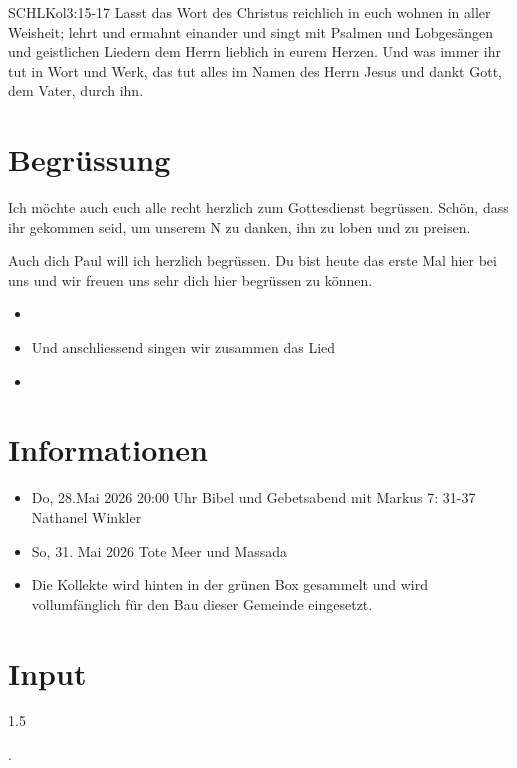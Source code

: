 \documentclass[fontsize=14pt]{mybib}
\newcommand{\Name}{Paul}
\begin{document}
\begin{bibelbox}{SCHL}{Kol}{3:15-17}
    Lasst das Wort des Christus reichlich in euch wohnen in aller Weisheit; lehrt und ermahnt einander und singt mit Psalmen und Lobgesängen und geistlichen Liedern dem Herrn lieblich in eurem Herzen. Und was immer ihr tut in Wort und Werk, das tut alles im Namen des Herrn Jesus und dankt Gott, dem Vater, durch ihn.
\end{bibelbox}
\section{Begrüssung}
Ich möchte auch euch alle recht herzlich zum Gottesdienst begrüssen. Schön, dass ihr gekommen seid, um unserem \herr N zu danken, ihn zu loben und zu preisen.

Auch dich \Name{} will ich herzlich begrüssen. Du bist heute das erste Mal hier bei uns und wir freuen uns sehr dich hier begrüssen zu können.
\begin{itemize}
    \item[] 
    \item[] Und anschliessend singen wir zusammen das Lied
    \item[] 
\end{itemize}

\section{Informationen}
\begin{itemize}
    \item {} Do, 28.Mai 2026 20:00 Uhr Bibel und Gebetsabend mit Markus 7: 31-37 Nathanel Winkler
    \item {} So, 31. Mai 2026 Tote Meer und Massada
    \item {} Die Kollekte wird hinten in der grünen Box gesammelt und wird vollumfänglich für den Bau dieser Gemeinde eingesetzt.
\end{itemize}

\section{ Input }
\begin{spacing}{1.5}
    
    .
\end{spacing}
\end{document}

